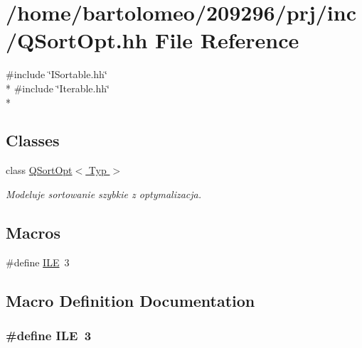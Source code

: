 \hypertarget{_q_sort_opt_8hh}{\section{/home/bartolomeo/209296/prj/inc/\-Q\-Sort\-Opt.hh File Reference}
\label{_q_sort_opt_8hh}
}
{\ttfamily \#include \char`\"{}I\-Sortable.\-hh\char`\"{}}\\*
{\ttfamily \#include \char`\"{}Iterable.\-hh\char`\"{}}\\*
\subsection*{Classes}
\begin{DoxyCompactItemize}
\item 
class \hyperlink{class_q_sort_opt}{Q\-Sort\-Opt$<$ Typ $>$}
\begin{DoxyCompactList}\small\item\em Modeluje sortowanie szybkie z optymalizacja. \end{DoxyCompactList}\end{DoxyCompactItemize}
\subsection*{Macros}
\begin{DoxyCompactItemize}
\item 
\#define \hyperlink{_q_sort_opt_8hh_aa59719977f35b96c6798e939300c0a8f}{I\-L\-E}~3
\end{DoxyCompactItemize}


\subsection{Macro Definition Documentation}
\hypertarget{_q_sort_opt_8hh_aa59719977f35b96c6798e939300c0a8f}{
\subsubsection[{I\-L\-E}]{\setlength{\rightskip}{0pt plus 5cm}\#define I\-L\-E~3}}\label{_q_sort_opt_8hh_aa59719977f35b96c6798e939300c0a8f}
